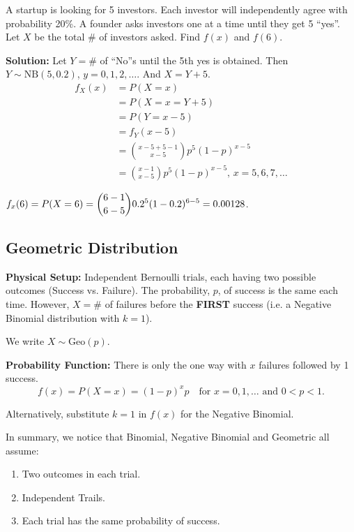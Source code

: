 \begin{example}
    A startup is looking for 5 investors. Each investor will independently agree with probability 20\%.
    A founder asks investors one at a time until they get 5 ``yes''.
    Let $X$ be the total $\#$ of investors asked. Find $f(x)$ and $f(6)$.

    \textbf{Solution:} Let $Y = \#$ of ``No''s until the 5th yes is obtained. Then $Y \sim \text{NB}(5,0.2)$, $y = 0,1,2,\ldots$.
    And $X = Y + 5$. \vspace{-5mm}
    \begin{align*}
        f_X(x) &= P(X=x) \\
        &= P(X = x = Y + 5) \\
        &= P(Y = x - 5) \\
        &= f_Y(x-5) \\
        &= \binom{x-5+5-1}{x-5}p^5(1-p)^{x-5} \\
        &= \binom{x-1}{x-5}p^5(1-p)^{x-5} \text{, $x = 5,6,7,\ldots$}
    \end{align*}

    $\displaystyle f_x(6) = P(X = 6) = \binom{6-1}{6-5}0.2^5(1-0.2)^{6-5} = 0.00128$.
    
\end{example}



\subsection{Geometric Distribution}

\textbf{Physical Setup:} Independent Bernoulli trials, each having two possible outcomes (Success vs. Failure). 
The probability, $p$, of success is the same each time. However, $X = \#$ of failures before the \textbf{FIRST} success
(i.e. a Negative Binomial distribution with $k=1$). 

We write $X \sim \text{Geo}(p)$.


\textbf{Probability Function:} There is only the one way with $x$ failures followed by 1 success.
\[f(x) = P(X=x) = (1-p)^x p \quad \text{for $x = 0,1,\ldots$ and $0<p<1$}.\]

\begin{remark}
    Alternatively, substitute $k=1$ in $f(x)$ for the Negative Binomial. \\
\end{remark}


In summary, we notice that Binomial, Negative Binomial and Geometric all assume:
\begin{enumerate}
    \item Two outcomes in each trial.
    \item Independent Trails.
    \item Each trial has the same probability of success. \\
\end{enumerate}




